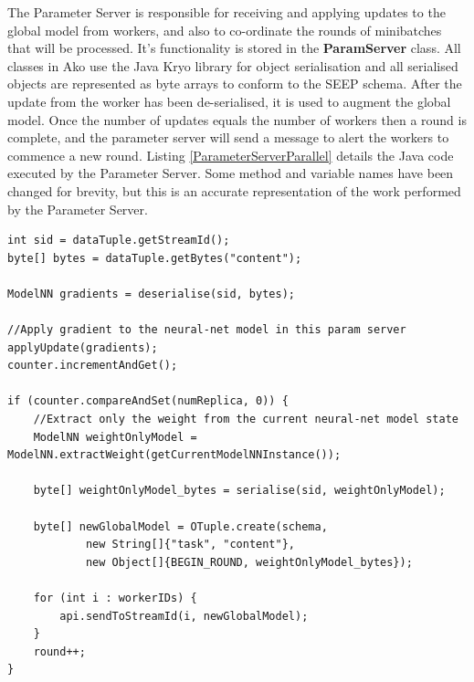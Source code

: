 \documentclass[12pt]{article}
\begin{document}
The Parameter Server is responsible for receiving and applying updates to the global model from workers, and also to co-ordinate the rounds of minibatches that will be processed. It's functionality is stored in the \textbf{ParamServer} class.
\newline
\newline
All classes in Ako use the Java Kryo library \cite{kryo} for object serialisation and all serialised objects are represented as byte arrays to conform to the SEEP schema. After the update from the worker has been de-serialised, it is used to augment the global model. Once the number of updates equals the number of workers then a round is complete, and the parameter server will send a message to alert the workers to commence a new round.
\newline
\newline
Listing \ref{ParameterServerParallel} details the Java code executed by the Parameter Server. Some method and variable names have been changed for brevity, but this is an accurate representation of the work performed by the Parameter Server.

\begin{lstlisting}[caption={Parameter Server message handling},label=ParameterServerParallel]
int sid = dataTuple.getStreamId();
byte[] bytes = dataTuple.getBytes("content");

ModelNN gradients = deserialise(sid, bytes);

//Apply gradient to the neural-net model in this param server
applyUpdate(gradients);
counter.incrementAndGet();

if (counter.compareAndSet(numReplica, 0)) {
    //Extract only the weight from the current neural-net model state
    ModelNN weightOnlyModel = ModelNN.extractWeight(getCurrentModelNNInstance());

    byte[] weightOnlyModel_bytes = serialise(sid, weightOnlyModel);

    byte[] newGlobalModel = OTuple.create(schema,
            new String[]{"task", "content"},
            new Object[]{BEGIN_ROUND, weightOnlyModel_bytes});

    for (int i : workerIDs) {
        api.sendToStreamId(i, newGlobalModel);
    }
    round++;
}
\end{lstlisting}
\end{document}
